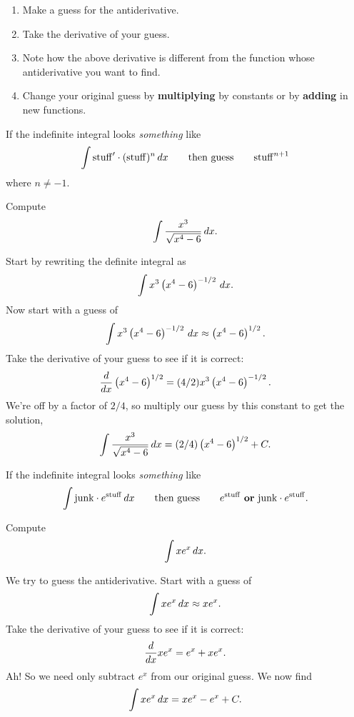 \begin{guessingAntiderivatives}\hfil
\begin{enumerate}
\item Make a guess for the antiderivative.
\item Take the derivative of your guess.
\item Note how the above derivative is different from the function
  whose antiderivative you want to find.
\item Change your original guess by \textbf{multiplying} by constants
  or by \textbf{adding} in new functions.
\end{enumerate}
\end{guessingAntiderivatives}

\begin{template}\label{template:powerchain}
If the indefinite integral looks \emph{something} like
\[
\int \mathrm{stuff}' \cdot (\mathrm{stuff})^n \, d x \qquad\text{then guess} \qquad \mathrm{stuff}^{n+1}
\]
where $n\ne -1$.
\end{template}

\begin{example} Compute
\[
\int \frac{x^3}{\sqrt{x^4 -6}} \, d x.
\]
\end{example}

\begin{solution}
Start by rewriting the definite integral as
\[
\int x^3\left(x^4 -6\right)^{-1/2} \, d x.
\]
Now start with a guess of 
\[
\int x^3\left(x^4 -6\right)^{-1/2} \, d x \approx \left(x^4 -6\right)^{1/2}.
\]
Take the derivative of your guess to see if it is correct:
\[
\frac{d}{dx}  \left(x^4 -6\right)^{1/2} = (4/2)x^3\left(x^4 -6\right)^{-1/2}.
\]
We're off by a factor of $2/4$, so multiply our guess by this constant
to get the solution,
\[
\int \frac{x^3}{\sqrt{x^4 -6}} \, d x = (2/4)\left(x^4 -6\right)^{1/2}+C.
\]
\end{solution}


\begin{template}\label{template:echain}
If the indefinite integral looks \emph{something} like
\[
\int \mathrm{junk}\cdot e^{\mathrm{stuff}} \, d x \qquad\text{then
  guess}\qquad e^{\mathrm{stuff}} \text{ \textbf{or} }\mathrm{junk}
\cdot e^{\mathrm{stuff}}.
\]
\end{template}


\begin{example}
Compute
\[
\int xe^{x} \, d x.
\]
\end{example}


\begin{solution}
We try to guess the antiderivative. Start with a guess of
\[
\int xe^x \, d x \approx xe^x.
\]
Take the derivative of your guess to see if it is correct:
\[
\frac{d}{dx} xe^x = e^x + xe^x.
\]
Ah! So we need only subtract $e^x$ from our original guess.  We now
find
\[
\int xe^x \, d x =xe^x - e^x + C.
\]
\end{solution}





